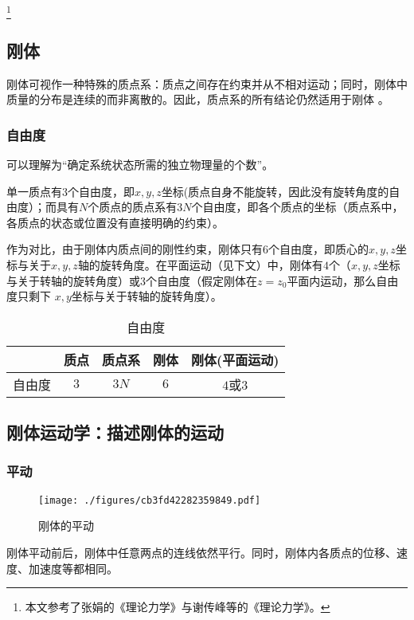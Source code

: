 
\footnote{本文参考了张娟的《理论力学》与谢传峰等的《理论力学》。}

\subsection{刚体}
刚体可视作一种特殊的质点系：质点之间存在约束并从不相对运动；同时，刚体中质量的分布是连续的而非离散的。因此，质点系的所有结论仍然适用于刚体 。

\subsubsection{自由度}
可以理解为“确定系统状态所需的独立物理量的个数”。

单一质点有$3$个自由度，即$x,y,z$坐标(质点自身不能旋转，因此没有旋转角度的自由度）；而具有$N$个质点的质点系有$3N$个自由度，即各个质点的坐标（质点系中，各质点的状态或位置没有直接明确的约束）。

作为对比，由于刚体内质点间的刚性约束，刚体只有$6$个自由度，即质心的$x,y,z$坐标与关于$x,y,z$轴的旋转角度。在平面运动（见下文）中，刚体有$4$个（$x,y,z$坐标与关于转轴的旋转角度）或$3$个自由度（假定刚体在$z=z_0$平面内运动，那么自由度只剩下 $x,y$坐标与关于转轴的旋转角度）。

\begin{table}[ht]
\centering
\caption{自由度}\label{tab_RGAB_3}
\begin{tabular}{|c|c|c|c|c|}
\hline
 & 质点 & 质点系 & 刚体 & 刚体(平面运动)\\
\hline
自由度 & $3$ & $3N$ & $6$ & $4$或$3$ \\
\hline
\end{tabular}
\end{table}

\subsection{刚体运动学：描述刚体的运动}

\subsubsection{平动}
\begin{figure}[ht]
\centering
\texttt{[image: ./figures/cb3fd42282359849.pdf]}
\caption{刚体的平动} \label{fig_RGAB_1}
\end{figure}
刚体平动前后，刚体中任意两点的连线依然平行。同时，刚体内各质点的位移、速度、加速度等都相同。


